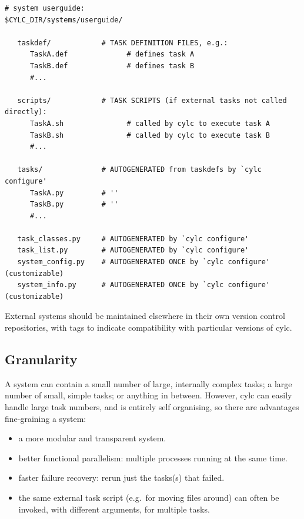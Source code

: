 \documentclass[11pt,a4paper]{article}
\begin{document}
\lstset{language=bash}

\begin{lstlisting}
# system userguide:
$CYLC_DIR/systems/userguide/

   taskdef/            # TASK DEFINITION FILES, e.g.:
      TaskA.def              # defines task A
      TaskB.def              # defines task B
      #...

   scripts/            # TASK SCRIPTS (if external tasks not called directly):
      TaskA.sh               # called by cylc to execute task A
      TaskB.sh               # called by cylc to execute task B
      #...

   tasks/              # AUTOGENERATED from taskdefs by `cylc configure'
      TaskA.py         # '' 
      TaskB.py         # ''
      #...

   task_classes.py     # AUTOGENERATED by `cylc configure' 
   task_list.py        # AUTOGENERATED by `cylc configure' 
   system_config.py    # AUTOGENERATED ONCE by `cylc configure' (customizable)
   system_info.py      # AUTOGENERATED ONCE by `cylc configure' (customizable)
\end{lstlisting}

External systems should be maintained elsewhere in their own version
control repositories, with tags to indicate compatibility with
particular versions of cylc.

\subsection{Granularity} 
\label{Granularity}

A system can contain a small number of large, internally complex tasks;
a large number of small, simple tasks; or anything in between. However,
cylc can easily handle large task numbers, and is entirely self
organising, so there are advantages fine-graining a system:

\begin{itemize}
    \item a more modular and transparent system.

    \item better functional parallelism: multiple processes running
        at the same time.

    \item faster failure recovery: rerun just the tasks(s) that failed. 

    \item the same external task script (e.g.\ for moving files around)
        can often be invoked, with different arguments, for multiple
        tasks.

\end{itemize}
\end{document}
